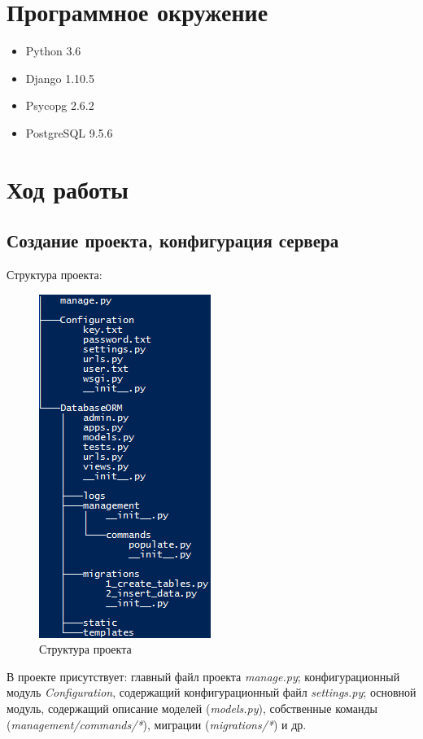 \documentclass[14pt,a4paper,report]{report}
\begin{document}
\section{Программное окружение}

\begin{itemize}
	\item Python 3.6
	\item Django 1.10.5
	\item Psycopg 2.6.2
	\item PostgreSQL 9.5.6
\end{itemize}

\clearpage

\section{Ход работы}

\subsection{Создание проекта, конфигурация сервера}

Структура проекта:

\begin{figure}[h!]
	\centering
	\includegraphics[scale = 0.75]{images/1.png}
	\caption{Структура проекта}
	\label{image:1}
\end{figure}

В проекте присутствует: главный файл проекта \emph{manage.py}; конфигурационный модуль \emph{Configuration}, содержащий конфигурационный файл \emph{settings.py}; основной модуль, содержащий описание моделей (\emph{models.py}), собственные команды (\emph{management/commands/*}), миграции (\emph{migrations/*}) и др.
\end{document}
